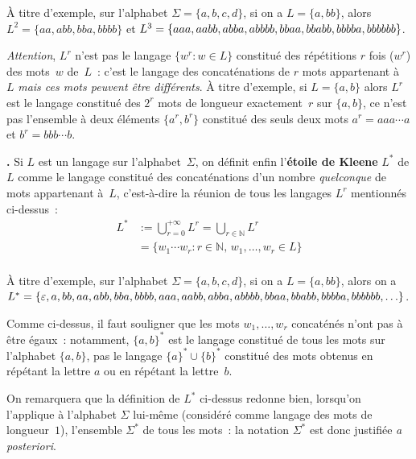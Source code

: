 \documentclass[12pt,a4paper]{article}
\theoremstyle{definition}
\newcommand\thingy{%
\refstepcounter{comcnt}\medskip\noindent\textbf{\thecomcnt.} }
\newcommand{\defin}[2][]{\def\latexsucks{#1}\ifx\latexsucks\empty\index{#2}\else\index{\latexsucks}\fi\textbf{#2}}
\begin{document}
À titre d'exemple, sur l'alphabet $\Sigma = \{a,b,c,d\}$, si on a $L =
\{a,bb\}$, alors $L^2 = \{aa, abb, bba, bbbb\}$ et $L^3 = \{aaa, aabb,
abba, abbbb, \penalty-100 bbaa, bbabb, bbbba, bbbbbb\}$.

\medskip

\emph{Attention}, $L^r$ n'est pas le langage $\{w^r : w\in L\}$
constitué des répétitions $r$ fois ($w^r$) des mots $w$ de $L$ : c'est
le langage des concaténations de $r$ mots appartenant à $L$ \emph{mais
  ces mots peuvent être différents}.  À titre d'exemple, si $L =
\{a,b\}$ alors $L^r$ est le langage constitué des $2^r$ mots de
longueur exactement $r$ sur $\{a,b\}$, ce n'est pas l'ensemble à deux
éléments $\{a^r, b^r\}$ constitué des seuls deux mots $a^r = aaa\cdots
a$ et $b^r = bbb\cdots b$.

\thingy\label{kleene-star} Si $L$ est un langage sur
l'alphabet $\Sigma$, on définit enfin l'\defin{étoile de Kleene} $L^*$ de $L$
comme le langage constitué des concaténations d'un nombre
\emph{quelconque} de mots appartenant à $L$, c'est-à-dire la réunion
de tous les langages $L^r$ mentionnés ci-dessus :
\[
\begin{aligned}
L^* &:= \bigcup_{r=0}^{+\infty} L^r = \bigcup_{r\in\mathbb{N}} L^r\\
&= \{w_1\cdots w_r : r\in\mathbb{N},\, w_1,\ldots,w_r\in L\}\\
\end{aligned}
\]

\smallskip

À titre d'exemple, sur l'alphabet $\Sigma = \{a,b,c,d\}$, si on a $L =
\{a,bb\}$, alors on a $L^* = \{\varepsilon, a, bb, \penalty-200 aa,
abb, bba, bbbb, \penalty-200 aaa, aabb, abba, abbbb, \penalty-100
bbaa, bbabb, bbbba, bbbbbb, \ldots\}$.

\smallskip

Comme ci-dessus, il faut souligner que les mots $w_1,\ldots,w_r$
concaténés n'ont pas à être égaux : notamment, $\{a,b\}^*$ est le
langage constitué de tous les mots sur l'alphabet $\{a,b\}$, pas le
langage $\{a\}^* \cup \{b\}^*$ constitué des mots obtenus en répétant
la lettre $a$ ou en répétant la lettre $b$.

\smallskip

On remarquera que la définition de $L^*$ ci-dessus redonne bien,
lorsqu'on l'applique à l'alphabet $\Sigma$ lui-même (considéré comme
langage des mots de longueur $1$), l'ensemble $\Sigma^*$ de tous les
mots : la notation $\Sigma^*$ est donc justifiée \textit{a
  posteriori}.
\end{document}
